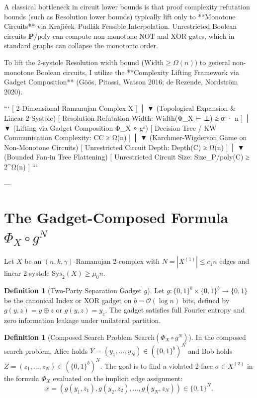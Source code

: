 \documentclass[11pt,a4paper]{article}
\theoremstyle{plain}
\theoremstyle{definition}
\newtheorem{definition}[theorem]{Definition}
\theoremstyle{remark}
\newcommand{\Width}{\mathrm{Width}}
\newcommand{\Search}{\mathrm{Search}}
\begin{document}
A classical bottleneck in circuit lower bounds is that proof complexity refutation bounds (such as Resolution lower bounds) typically lift only to **Monotone Circuits** via Kraj\'{\i}\v{c}ek--Pudl\'ak Feasible Interpolation. Unrestricted Boolean circuits $\mathbf{P}/\mathrm{poly}$ can compute non-monotone $\mathrm{NOT}$ and $\mathrm{XOR}$ gates, which in standard graphs can collapse the monotonic order.

To lift the 2-systole Resolution width bound ($\Width \ge \Omega(n)$) to general non-monotone Boolean circuits, I utilize the **Complexity Lifting Framework via Gadget Composition** (G\"o\"os, Pitassi, Watson 2016; de Rezende, Nordstr\"om 2020).

```
[ 2-Dimensional Ramanujan Complex X ]
               │
               ▼  (Topological Expansion & Linear 2-Systole)
[ Resolution Refutation Width: Width(Φ_X ⊢ ⊥) ≥ α · n ]
               │
               ▼  (Lifting via Gadget Composition Φ_X ∘ gⁿ)
[ Decision Tree / KW Communication Complexity: CC ≥ Ω(n) ]
               │
               ▼  (Karchmer-Wigderson Game on Non-Monotone Circuits)
[ Unrestricted Circuit Depth: Depth(C) ≥ Ω(n) ]
               │
               ▼  (Bounded Fan-in Tree Flattening)
[ Unrestricted Circuit Size: Size_{P/poly}(C) ≥ 2^{Ω(n)} ]
```

---

\section{The Gadget-Composed Formula $\Phi_X \circ g^N$}

Let $X$ be an $(n, k, \gamma)$-Ramanujan 2-complex with $N = |X^{(1)}| \le c_1 n$ edges and linear 2-systole $\mathrm{Sys}_2(X) \ge \mu_0 n$.

\begin{definition}[Two-Party Separation Gadget $g$]
Let $g: \{0,1\}^b \times \{0,1\}^b \to \{0,1\}$ be the canonical Index or XOR gadget on $b = \mathcal{O}(\log n)$ bits, defined by $g(y, z) = y \oplus z$ or $g(y, z) = y_z$. The gadget satisfies full Fourier entropy and zero information leakage under unilateral partition.
\end{definition}

\begin{definition}[Composed Search Problem $\Search(\Phi_X \circ g^N)$]
In the composed search problem, Alice holds $Y = (y_1, \dots, y_N) \in (\{0,1\}^b)^N$ and Bob holds $Z = (z_1, \dots, z_N) \in (\{0,1\}^b)^N$. 
The goal is to find a violated 2-face $\sigma \in X^{(2)}$ in the formula $\Phi_X$ evaluated on the implicit edge assignment:
\[
x = (g(y_1, z_1), g(y_2, z_2), \dots, g(y_N, z_N)) \in \{0, 1\}^N.
\]
\end{definition}
\end{document}
